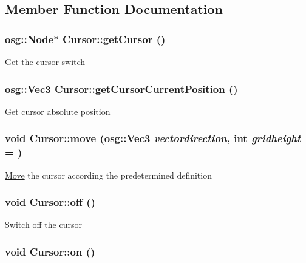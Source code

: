 \subsection{Member Function Documentation}
\hypertarget{class_cursor_a54b6cc7f6310ea31fc935629c75df6e1}{
\subsubsection[{getCursor}]{\setlength{\rightskip}{0pt plus 5cm}osg::Node$\ast$ Cursor::getCursor ()}}
\label{class_cursor_a54b6cc7f6310ea31fc935629c75df6e1}
Get the cursor switch \hypertarget{class_cursor_a6682ab87a40385277e836ab299b0a4e5}{
\subsubsection[{getCursorCurrentPosition}]{\setlength{\rightskip}{0pt plus 5cm}osg::Vec3 Cursor::getCursorCurrentPosition ()}}
\label{class_cursor_a6682ab87a40385277e836ab299b0a4e5}
Get cursor absolute position \hypertarget{class_cursor_a2f4cb72de21bdefb8a9875e2a2974b48}{
\subsubsection[{move}]{\setlength{\rightskip}{0pt plus 5cm}void Cursor::move (osg::Vec3 {\em vectordirection}, \/  int {\em gridheight} = {})}}
\label{class_cursor_a2f4cb72de21bdefb8a9875e2a2974b48}
\hyperlink{class_move}{Move} the cursor according the predetermined definition \hypertarget{class_cursor_aaa35f57cf0b65c009c949c59276df3fd}{
\subsubsection[{off}]{\setlength{\rightskip}{0pt plus 5cm}void Cursor::off ()}}
\label{class_cursor_aaa35f57cf0b65c009c949c59276df3fd}
Switch off the cursor \hypertarget{class_cursor_a3ca49b518bc6cca718f0a5d04595d1cf}{
\subsubsection[{on}]{\setlength{\rightskip}{0pt plus 5cm}void Cursor::on ()}}
